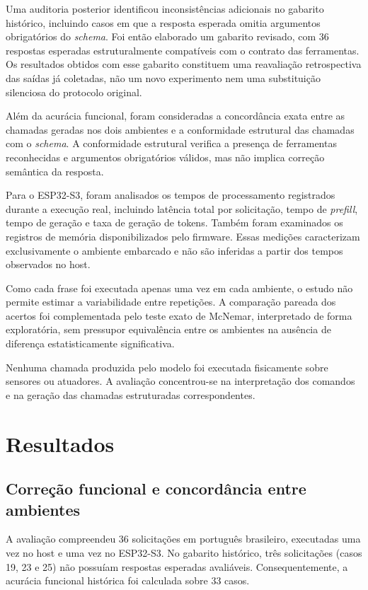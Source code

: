 \documentclass[12pt]{article}
\begin{document}
Uma auditoria posterior identificou inconsistências
adicionais no gabarito histórico, incluindo casos
em que a resposta esperada omitia argumentos
obrigatórios do \textit{schema}. Foi então elaborado
um gabarito revisado, com 36 respostas esperadas
estruturalmente compatíveis com o contrato das
ferramentas. Os resultados obtidos com esse gabarito
constituem uma reavaliação retrospectiva das saídas
já coletadas, não um novo experimento nem uma
substituição silenciosa do protocolo original.

Além da acurácia funcional, foram consideradas a
concordância exata entre as chamadas geradas nos
dois ambientes e a conformidade estrutural das
chamadas com o \textit{schema}. A conformidade
estrutural verifica a presença de ferramentas
reconhecidas e argumentos obrigatórios válidos,
mas não implica correção semântica da resposta.

Para o ESP32-S3, foram analisados os tempos de
processamento registrados durante a execução real,
incluindo latência total por solicitação, tempo de
\textit{prefill}, tempo de geração e taxa de geração
de tokens. Também foram examinados os registros
de memória disponibilizados pelo firmware.
Essas medições caracterizam exclusivamente o
ambiente embarcado e não são inferidas a partir
dos tempos observados no host.

Como cada frase foi executada apenas uma vez em
cada ambiente, o estudo não permite estimar a
variabilidade entre repetições. A comparação
pareada dos acertos foi complementada pelo teste
exato de McNemar, interpretado de forma exploratória,
sem pressupor equivalência entre os ambientes
na ausência de diferença estatisticamente
significativa.

Nenhuma chamada produzida pelo modelo foi
executada fisicamente sobre sensores ou
atuadores. A avaliação concentrou-se na
interpretação dos comandos e na geração
das chamadas estruturadas correspondentes.


\section{Resultados}
\label{sec:resultados}

\subsection{Correção funcional e concordância entre ambientes}

A avaliação compreendeu 36 solicitações em português
brasileiro, executadas uma vez no host e uma vez no
ESP32-S3. No gabarito histórico, três solicitações
(casos 19, 23 e 25) não possuíam respostas esperadas
avaliáveis. Consequentemente, a acurácia funcional
histórica foi calculada sobre 33 casos.
\end{document}
